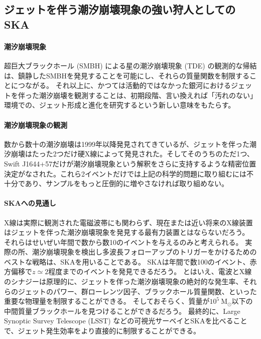 \subsection{ジェットを伴う潮汐崩壊現象の強い狩人としてのSKA}
\label{c09.s2.ss4}

\paragraph{潮汐崩壊現象}

超巨大ブラックホール (SMBH) による星の潮汐崩壊現象 (TDE) の観測的な帰結は、鎮静したSMBHを発見することを可能にし、それらの質量関数を制限することにつながる。
それ以上に、かつては活動的ではなかった銀河におけるジェットを伴った潮汐崩壊を観測することは、初期段階、言い換えれば「汚れのない」環境での、ジェット形成と進化を研究するという新しい意味をもたらす。

\paragraph{潮汐崩壊現象の観測}

数から数十の潮汐崩壊は1999年以降発見されてきているが、ジェットを伴った潮汐崩壊はたった2つだけ硬X線によって発見された。そしてそのうちのただ1つ、Swift J1644+57だけが潮汐崩壊現象という解釈をさらに支持するような精密位置決定がなされた。これら2イベントだけでは上記の科学的問題に取り組むには不十分であり、サンプルをもっと圧倒的に増やさなければ取り組めない。

\paragraph{SKAへの見通し}

X線は実際に観測された電磁波帯にも関わらず、現在または近い将来のX線装置はジェットを伴った潮汐崩壊現象を発見する最有力装置とはならないだろう。
それらはせいぜい年間で数から数10のイベントを与えるのみと考えられる。
実際の所、潮汐崩壊現象を検出し多波長フォローアップのトリガーをかけるためのベストな戦略は、SKAを用いることである。
SKAは年間で数100のイベント、赤方偏移で$z\simeq 2$程度までのイベントを発見できるだろう。
とはいえ、電波とX線のシナジーは原理的に、ジェットを伴った潮汐崩壊現象の絶対的な発生率、それらのジェットのパワー、群ローレンツ因子、ブラックホール質量関数、といった重要な物理量を制限することができる。
そしておそらく、質量が$10^5~\text{M}_\odot$以下の中間質量ブラックホールを見つけることができるだろう。
最終的に、Large Synoptic Survey Telescope (LSST) などの可視光サーベイとSKAを比べることで、ジェット発生効率をより直接的に制限することができる。


